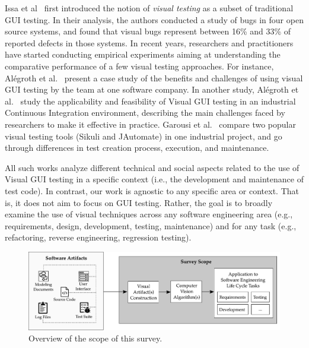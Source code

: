Issa et al~\cite{6320526} first introduced the notion of
\textit{visual testing} as a subset of traditional GUI testing.
In their analysis, the authors conducted a study of bugs
in four open source systems, and found that visual bugs
represent between 16\% and 33\% of reported defects in those systems. 
In recent years, researchers and practitioners have started
conducting empirical experiments aiming at understanding the
comparative performance of a few visual testing approaches. 
For instance, Al\'{e}groth et al.~\cite{alegroth2017,
alegroth2015conceptualization}
present a case study of the benefits and challenges of
using visual GUI testing by the team at one software company. 
In another study, Al\'{e}groth et al.~\cite{8367046} study 
the applicability and feasibility of Visual GUI testing in 
an industrial Continuous Integration environment, describing the 
main challenges faced by researchers to make it effective in practice. 
Garousi et al.~\cite{garousi2017comparing} compare two popular visual
testing tools (Sikuli and JAutomate) in one industrial project,
and go through differences in test creation process, execution,
and maintenance.

All such works analyze different technical and social aspects 
related to the use of Visual GUI testing in a specific context 
(i.e., the development and maintenance of test code). 
In contrast, our work is agnostic to any specific area or context. 
That is, it does not aim to focus on GUI testing. 
Rather, the goal is to broadly examine the use of visual techniques 
across any software engineering area (e.g., requirements, design, 
development, testing, maintenance) and for any task (e.g., refactoring, 
reverse engineering, regression testing). 


\begin{figure}
    \centering
    \includegraphics[scale=0.50]{survey/figures/scope-horizontal}
    \caption{Overview of the scope of this survey.}
    \label{fig:scope}
\end{figure}




